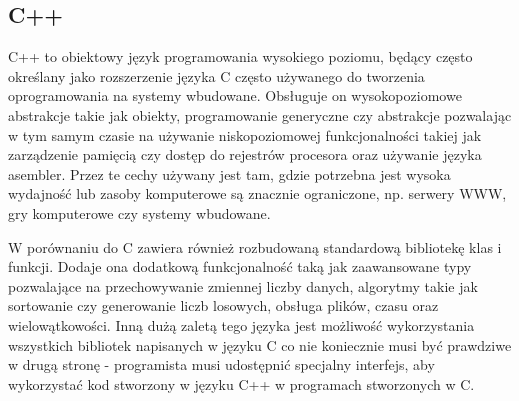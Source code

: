 \subsection*{C++}
C++\cite{isocpp} to obiektowy język programowania wysokiego poziomu, będący często określany jako
rozszerzenie języka C często używanego do tworzenia oprogramowania na systemy wbudowane.
Obsługuje on wysokopoziomowe abstrakcje takie jak obiekty, programowanie generyczne czy
abstrakcje pozwalając w tym samym czasie na używanie niskopoziomowej funkcjonalności 
takiej jak zarządzenie pamięcią czy dostęp do rejestrów procesora oraz używanie języka asembler.
Przez te cechy używany jest tam, gdzie potrzebna jest wysoka wydajność lub zasoby komputerowe
są znacznie ograniczone, np. serwery WWW, gry komputerowe czy systemy wbudowane.

W porównaniu do C zawiera również rozbudowaną standardową bibliotekę klas i funkcji.
Dodaje ona dodatkową funkcjonalność taką jak zaawansowane typy pozwalające na
przechowywanie zmiennej liczby danych, algorytmy takie jak sortowanie czy 
generowanie liczb losowych, obsługa plików, czasu oraz wielowątkowości.
Inną dużą zaletą tego języka jest możliwość wykorzystania wszystkich bibliotek napisanych
w języku C co nie koniecznie musi być prawdziwe w drugą stronę - programista musi
udostępnić specjalny interfejs, aby wykorzystać kod stworzony w języku C++
w programach stworzonych w C.
